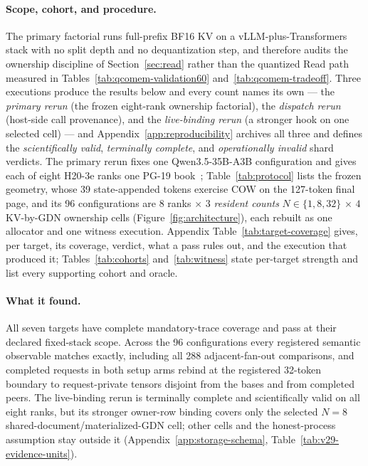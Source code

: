 \documentclass{article}
\begin{document}
\paragraph{Scope, cohort, and procedure.} \label{sec:target-status} The primary
factorial runs full-prefix BF16 KV on a vLLM-plus-Transformers stack with no
split depth and no dequantization step, and therefore audits the ownership
discipline of Section~\ref{sec:read} rather than the quantized Read path
measured in Tables~\ref{tab:qcomem-validation60} and~\ref{tab:qcomem-tradeoff}.
Three executions produce the results below and every count names its own ---
the \emph{primary rerun} (the frozen eight-rank ownership factorial), the
\emph{dispatch rerun} (host-side call provenance), and the \emph{live-binding
rerun} (a stronger hook on one selected cell) --- and
Appendix~\ref{app:reproducibility} archives all three and defines the
\emph{scientifically valid}, \emph{terminally complete}, and
\emph{operationally invalid} shard verdicts. The primary rerun fixes one
Qwen3.5-35B-A3B configuration \citep{qwen2026qwen35,qwen2026qwen35modelcard}
and gives each of eight H20-3e ranks one PG-19 book~\citep{rae2020compressive};
Table~\ref{tab:protocol} lists the frozen geometry, whose 39 state-appended
tokens exercise COW on the 127-token final page, and its 96 configurations are
$8$ ranks $\times$ $3$ \emph{resident counts} $N\in\{1,8,32\}$ $\times$ $4$
KV-by-GDN ownership cells (Figure~\ref{fig:architecture}), each rebuilt as one
allocator and one witness execution. Appendix Table~\ref{tab:target-coverage}
gives, per target, its coverage, verdict, what a pass rules out, and the
execution that produced it; Tables~\ref{tab:cohorts} and~\ref{tab:witness}
state per-target strength and list every supporting cohort and oracle.

\paragraph{What it found.}
All seven targets have complete mandatory-trace coverage and pass at their
declared fixed-stack scope.  Across the 96 configurations every registered
semantic observable matches exactly, including all 288 adjacent-fan-out
comparisons, and completed requests in both setup arms rebind at the registered
32-token boundary to request-private tensors disjoint from the bases and from
completed peers.  The live-binding rerun is terminally complete and
scientifically valid on all eight ranks, but its stronger owner-row binding
covers only the selected $N=8$ shared-document/materialized-GDN cell; other
cells and the honest-process assumption stay outside it
(Appendix~\ref{app:storage-schema}, Table~\ref{tab:v29-evidence-units}).
\end{document}
